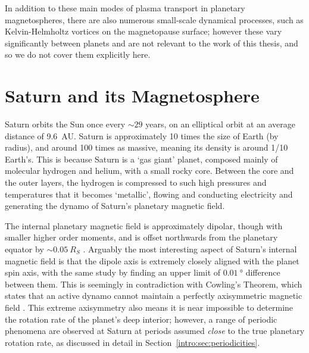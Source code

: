 In addition to these main modes of plasma transport in planetary magnetospheres, there are also numerous small-scale dynamical processes, such as Kelvin-Helmholtz vortices on the magnetopause surface; however these vary significantly between planets and are not relevant to the work of this thesis, and so we do not cover them explicitly here.

\section{Saturn and its Magnetosphere}\label{intro:sec:saturn}
Saturn orbits the Sun once every ${\sim}29$ years, on an elliptical orbit at an average distance of \SI{9.6}{AU}. Saturn is approximately 10 times the size of Earth (by radius), and around 100 times as massive, meaning its density is around 1/10 Earth's. This is because Saturn is a `gas giant' planet, composed mainly of molecular hydrogen and helium, with a small rocky core. Between the core and the outer layers, the hydrogen is compressed to such high pressures and temperatures that it becomes `metallic', flowing and conducting electricity and generating the dynamo of Saturn's planetary magnetic field.

The internal planetary magnetic field is approximately dipolar, though with smaller higher order moments, and is offset northwards from the planetary equator by ${\sim}\SI{0.05}{R_S}$ \citep{dougherty2018}. Arguably the most interesting aspect of Saturn's internal magnetic field is that the dipole axis is extremely closely aligned with the planet spin axis, with the same study by \citet{dougherty2018} finding an upper limit of $\SI{0.01}{\degree}$ difference between them. This is seemingly in contradiction with Cowling's Theorem, which states that an active dynamo cannot maintain a perfectly axisymmetric magnetic field \citep{cowling1933}. This extreme axisymmetry also means it is near impossible to determine the rotation rate of the planet's deep interior; however, a range of periodic phenomena are observed at Saturn at periods assumed \textit{close} to the true planetary rotation rate, as discussed in detail in Section~\ref{intro:sec:periodicities}.

